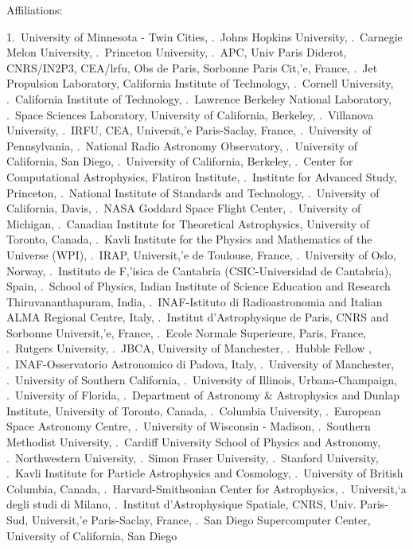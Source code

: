 \documentclass[17pt]{extarticle}
\begin{document}
\normalsize {Affiliations:}
%
\raggedright
\footnotesize {
1.~University of Minnesota - Twin Cities, .~Johns Hopkins University, .~Carnegie Melon University, .~Princeton University, .~APC, Univ Paris Diderot, CNRS/IN2P3, CEA/lrfu, Obs de Paris, Sorbonne Paris Cit,'e, France, .~Jet Propulsion Laboratory, California Institute of Technology, .~Cornell University, .~California Institute of Technology, .~Lawrence Berkeley National Laboratory, .~Space Sciences Laboratory, University of California, Berkeley, .~Villanova University, .~IRFU, CEA, Universit,'e Paris-Saclay, France, .~University of Pennsylvania, .~National Radio Astronomy Observatory, .~University of California, San Diego, .~University of California, Berkeley, .~Center for Computational Astrophysics, Flatiron Institute, .~Institute for Advanced Study, Princeton, .~National Institute of Standards and Technology, .~University of California, Davis, .~NASA Goddard Space Flight Center, .~University of Michigan, .~Canadian Institute for Theoretical Astrophysics, University of Toronto, Canada, .~Kavli Institute for the Physics and Mathematics of the Universe (WPI), .~IRAP, Universit,'e de Toulouse, France, .~University of Oslo, Norway, .~Instituto de F,'isica de Cantabria (CSIC-Universidad de Cantabria), Spain, .~School of Physics, Indian Institute of Science Education and Research Thiruvananthapuram, India, .~INAF-Istituto di Radioastronomia and Italian ALMA Regional Centre, Italy, .~Institut d'Astrophysique de Paris, CNRS and Sorbonne Universit,'e, France, .~Ecole Normale Superieure, Paris, France, .~Rutgers University, .~JBCA, University of Manchester, .~Hubble Fellow          , .~INAF-Osservatorio Astronomico di Padova, Italy, .~University of Manchester, .~University of Southern California, .~University of Illinois, Urbana-Champaign, .~University of Florida, .~Department of Astronomy \& Astrophysics and Dunlap Institute, University of Toronto, Canada, .~Columbia University, .~European Space Astronomy Centre, .~University of Wisconsin - Madison, .~Southern Methodist University, .~Cardiff University School of Physics and Astronomy, .~Northwestern University, .~Simon Fraser University, .~Stanford University, .~Kavli Institute for Particle Astrophysics and Cosmology, .~University of British Columbia, Canada, .~Harvard-Smithsonian Center for Astrophysics, .~Universit,`a degli studi di Milano, .~Institut d'Astrophysique Spatiale, CNRS, Univ. Paris-Sud, Universit,'e Paris-Saclay, France, .~San Diego Supercomputer Center, University of California, San Diego
}
\end{document}
